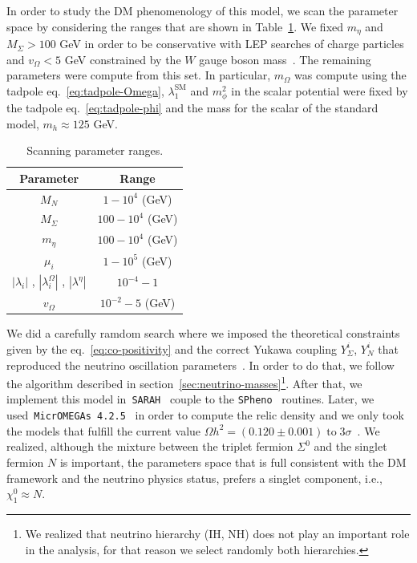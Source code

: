 \documentclass[12pt,letterpaper]{article}
\begin{document}
In order to study the DM phenomenology of this model, we scan the parameter space by considering the ranges that are shown in Table~\ref{tab:scan-parameter}. We fixed $m_{\eta}$ and $M_{\Sigma} > 100$ GeV in order to be conservative with LEP searches of charge particles~\cite{ALEPH:2005ab} and $v_{\Omega}<5$ GeV constrained by the $W$ gauge boson mass~\cite{Agashe:2014kda}. 
The remaining parameters were compute from this set. 
In particular, $m_{\Omega}$ was compute using the tadpole eq.~\ref{eq:tadpole-Omega}, $\lambda_1^{\text{SM}}$ and $m_{\phi}^2$ in the scalar potential were fixed by the tadpole eq.~\ref{eq:tadpole-phi} and the mass for the scalar of the standard model, $m_{h}\approx 125$ GeV.
%
\begin{table}
\centering
\begin{tabular}{|c|c|}
\hline
Parameter & Range\\
\hline
$M_N$ &  $1-10^4$ (GeV) \\
$M_{\Sigma}$ &  $100-10^4$ (GeV) \\
$m_{\eta}$ &  $100-10^4$ (GeV) \\
$\mu_i$ & $1-10^{5}$ (GeV) \\
$|\lambda_i|$ , $|\lambda_i^{\Omega}|$ , $|\lambda^{\eta}|$ & $10^{-4} - 1$ \\
$v_{\Omega}$ & $10^{-2}- 5$  (GeV)\\
\hline
\end{tabular}
\caption{Scanning parameter ranges.}
\label{tab:scan-parameter}
\end{table}
%
We did  a carefully ramdom search where we imposed the theoretical constraints given by the eq.~\ref{eq:co-positivity} and the correct Yukawa coupling $Y_{\Sigma}^i$, $Y_N^i$ that reproduced the neutrino oscillation parameters~\cite{Forero:2014bxa, deSalas:2017kay}. In order to do that, we follow the algorithm described in section~\ref{sec:neutrino-masses}\footnote{We realized that neutrino hierarchy (IH, NH) does not play an important role in the analysis, for that reason we select randomly both hierarchies.}.
%
After that, we implement this model in~\texttt{SARAH}~\cite{Staub:2008uz,Staub:2009bi,Staub:2010jh,Staub:2012pb,Staub:2013tta} couple to the \texttt{SPheno}~\cite{Porod:2003um,Porod:2011nf} routines. 
Later, we used~\texttt{MicrOMEGAs 4.2.5}~\cite{Belanger:2006is} in order to compute the relic density and we only took the models that fulfill the current value $\Omega h^2 = (0.120 \pm 0.001)\; \text{to}\; 3\sigma$~\cite{Aghanim:2018eyx}.
We realized, although the mixture between the triplet fermion $\Sigma^0$ and the singlet fermion $N$ is important, the parameters space that is full consistent with the DM framework and the neutrino physics status, prefers a singlet component, i.e., $\chi_1^0\approx N$. 
\end{document}
